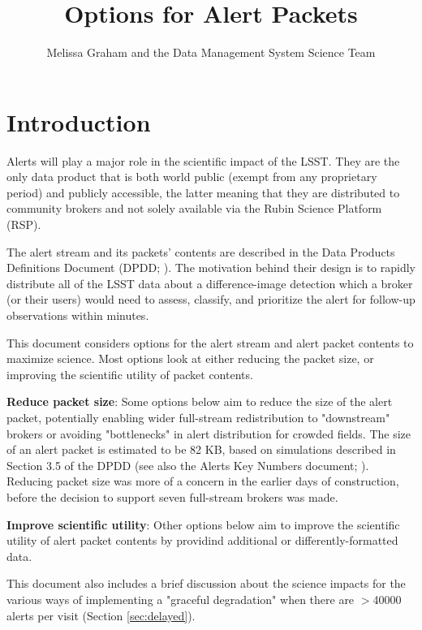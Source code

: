 \documentclass[DM,authoryear,toc]{lsstdoc}
\title{Options for Alert Packets}
\author{%
Melissa Graham and the Data Management System Science Team
}
\date{\vcsDate}
\begin{document}
\maketitle


\section{Introduction}\label{sec:introduction}

Alerts will play a major role in the scientific impact of the LSST.
They are the only data product that is both world public (exempt from any proprietary period) and publicly accessible,
the latter meaning that they are distributed to community brokers and not solely available via the Rubin Science Platform (RSP).

The alert stream and its packets' contents are described in the Data Products Definitions Document (DPDD; ).
The motivation behind their design is to rapidly distribute all of the LSST data about a difference-image detection which a broker (or their users) would need to assess, classify, and prioritize the alert for follow-up observations within minutes.

This document considers options for the alert stream and alert packet contents to maximize science.
Most options look at either reducing the packet size, or improving the scientific utility of packet contents.

\textbf{Reduce packet size}:
Some options below aim to reduce the size of the alert packet, potentially enabling wider full-stream redistribution to "downstream" brokers or avoiding "bottlenecks" in alert distribution for crowded fields.
The size of an alert packet is estimated to be 82 KB, based on simulations described in Section 3.5 of the DPDD (see also the Alerts Key Numbers document; ).
Reducing packet size was more of a concern in the earlier days of construction, before the decision to support seven full-stream brokers was made.

\textbf{Improve scientific utility}:
Other options below aim to improve the scientific utility of alert packet contents by providind additional or differently-formatted data.

This document also includes a brief discussion about the science impacts for the various ways of implementing a "graceful degradation" when there are $>$40000 alerts per visit (Section \ref{sec:delayed}).
\end{document}

